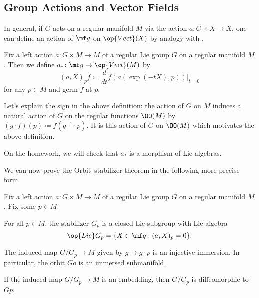 \documentclass[../notes.tex]{subfiles}
\begin{document}
\subsection{Group Actions and Vector Fields}
In general, if $G$ acts on a regular manifold $M$ via the action $a\colon G\times X\to X$, one can define an action of $\mf g$ on $\op{Vect}(X)$ by analogy with .
\begin{definition}
	Fix a left action $a\colon G\times M\to M$ of a regular Lie group $G$ on a regular manifold $M$. Then we define $a_*\colon\mf g\to\op{Vect}(M)$ by
	\[(a_*X)_pf\coloneqq\frac d{dt}f(a(\exp(-tX),p))\bigg|_{t=0}\]
	for any $p\in M$ and germ $f$ at $p$.
\end{definition}
\begin{remark}
	Let's explain the sign in the above definition: the action of $G$ on $M$ induces a natural action of $G$ on the regular functions $\OO(M)$ by $(g\cdot f)(p)\coloneqq f\left(g^{-1}\cdot p\right)$. It is this action of $G$ on $\OO(M)$ which motivates the above definition.
\end{remark}
\begin{remark}
	On the homework, we will check that $a_*$ is a morphism of Lie algebras.
\end{remark}
We can now prove the Orbit--stabilizer theorem in the following more precise form.
\begin{theorem}
	Fix a left action $a\colon G\times M\to M$ of a regular Lie group $G$ on a regular manifold $M$. Fix some $p\in M$.
	\begin{listalph}
		\item For all $p\in M$, the stabilizer $G_p$ is a closed Lie subgroup with Lie algebra
		\[\op{Lie}G_p=\{X\in\mf g:(a_*X)_p=0\}.\]
		\item The induced map $G/G_p\to M$ given by $g\mapsto g\cdot p$ is an injective immersion. In particular, the orbit $Go$ is an immersed submanifold.
		\item If the induced map $G/G_p\to M$ is an embedding, then $G/G_p$ is diffeomorphic to $Gp$.
	\end{listalph}
\end{theorem}
\end{document}
